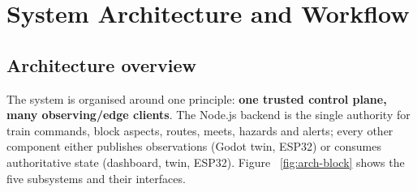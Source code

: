 \chapter{System Architecture and Workflow}\label{cha:architecture}

\section{Architecture overview}

The system is organised around one principle: \textbf{one trusted control
plane, many observing/edge clients}. The Node.js backend is the single
authority for train commands, block aspects, routes, meets, hazards and
alerts; every other component either publishes observations (Godot twin,
ESP32) or consumes authoritative state (dashboard, twin, ESP32). Figure~%
\ref{fig:arch-block} shows the five subsystems and their interfaces.

